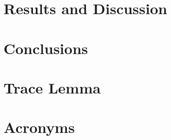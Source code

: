 \documentclass[spanish,english,12pt,letterpaper,oneside]{book}
\begin{document}
\chapter{Results and Discussion}




%


\chapter{Conclusions}
\label{conclusions}


\appendix
{}
\chapter{Trace Lemma}


\chapter{Acronyms}
\label{acronyms}





\backmatter



\end{document}
